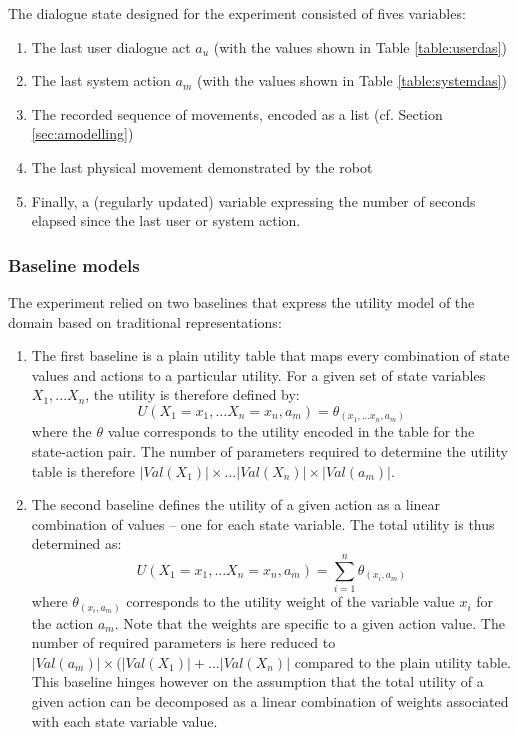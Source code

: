 The dialogue state designed for the experiment consisted of fives variables: \begin{enumerate}
\item The last user dialogue act $a_u$ (with the values shown in Table \ref{table:userdas})
\item The last system action $a_m$ (with the values shown in Table \ref{table:systemdas})
\item The recorded sequence of movements, encoded as a list (cf. Section \ref{sec:amodelling})
\item The last physical movement demonstrated by the robot
\item Finally, a (regularly updated) variable expressing the number of seconds elapsed since the last user or system action. 
\end{enumerate}

\subsubsection*{Baseline models}

The experiment relied on two baselines that express the utility model of the domain based on traditional representations: \begin{enumerate}
\item The first baseline is a plain utility table that maps every combination of state values and actions to a particular utility.  For a given set of state variables $X_1,...X_n$, 
the utility is therefore defined by: 
\begin{equation}
U(X_1=x_1,...X_n=x_n, a_m) = \theta_{(x_1,...x_n, a_m)}
\end{equation}
where the $\theta$ value corresponds to the utility encoded in the table for the state-action pair. The number of parameters required to determine the utility table is therefore $|Val(X_1)| \times ... |Val(X_n)| \times |Val(a_m)|$. 
\item The second baseline defines the utility of a given action as a linear combination of values -- one for each state variable.  The total utility is thus determined as:
\begin{equation}
U(X_1=x_1,...X_n=x_n, a_m) = \sum_{i=1}^{n} \theta_{(x_i, a_m)}
\end{equation}
where $\theta_{(x_i, a_m)}$ corresponds to the utility weight of the variable value $x_i$ for the action $a_m$.  Note that the weights are specific to a given action value. The number of required parameters is here reduced to $|Val(a_m)| \times (|Val(X_1)| + ... |Val(X_n)|$ compared to the plain utility table.  This baseline hinges however on the assumption that the total utility of a given action can be decomposed as a linear combination of weights associated with each state variable value.
\end{enumerate}

